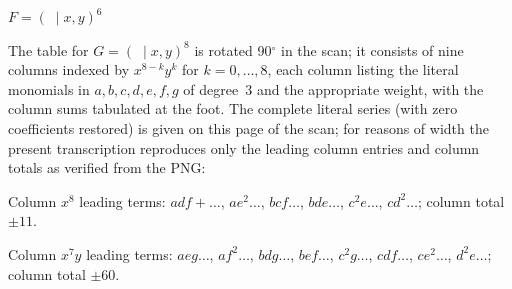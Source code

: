 \documentclass[11pt]{article}
\begin{document}
\begin{center}
\bigskip
$F=(\;\mid x,y)^{6}$

\medskip
{}
\end{center}

\newpage
\noindent
The table for $G=(\;\mid x,y)^{8}$ is rotated 90$^{\circ}$ in the
scan; it consists of nine columns indexed by
$x^{8-k}y^{k}$ for $k=0,\ldots,8$, each column listing the literal
monomials in $a,b,c,d,e,f,g$ of degree~3 and the appropriate
weight, with the column sums tabulated at the foot.  The complete
literal series (with zero coefficients restored) is given on this
page of the scan; for reasons of width the present transcription
reproduces only the leading column entries and column totals as
verified from the PNG:
\medskip

\noindent
Column $x^{8}$ leading terms: $adf+\ldots$, $ae^{2}\ldots$, $bcf\ldots$, $bde\ldots$, $c^{2}e\ldots$, $cd^{2}\ldots$; column total $\pm 11$.
\smallskip

\noindent
Column $x^{7}y$ leading terms: $aeg\ldots$, $af^{2}\ldots$, $bdg\ldots$, $bef\ldots$, $c^{2}g\ldots$, $cdf\ldots$, $ce^{2}\ldots$, $d^{2}e\ldots$; column total $\pm 60$.
\smallskip
\end{document}
